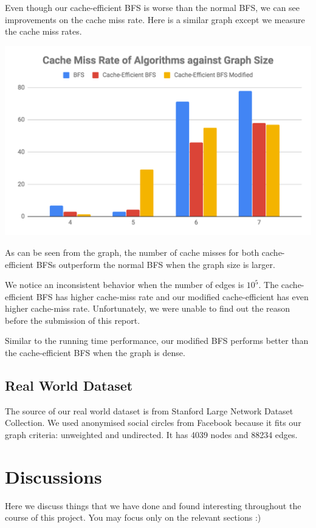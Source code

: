 \documentclass[12pt]{article}
\begin{document}
Even though our cache-efficient BFS is worse than the normal BFS, we can see improvements on the cache miss rate. Here is a similar graph except we measure the cache miss rates.

\includegraphics[scale=0.4]{graph-2}

As can be seen from the graph, the number of cache misses for both cache-efficient BFSs outperform the normal BFS when the graph size is larger.

We notice an inconsistent behavior when the number of edges is $10^5$. The cache-efficient BFS has higher cache-miss rate and our modified cache-efficient has even higher cache-miss rate. Unfortunately, we were unable to find out the reason before the submission of this report.

Similar to the running time performance, our modified BFS performs better than the cache-efficient BFS when the graph is dense.

\subsection{Real World Dataset}

The source of our real world dataset is from Stanford Large Network Dataset Collection. We used anonymised social circles from Facebook because it fits our graph criteria: unweighted and undirected. It has 4039 nodes and 88234 edges.

\pagebreak

\section{Discussions}

Here we discuss things that we have done and found interesting throughout the course of this project. You may focus only on the relevant sections :)
\end{document}
